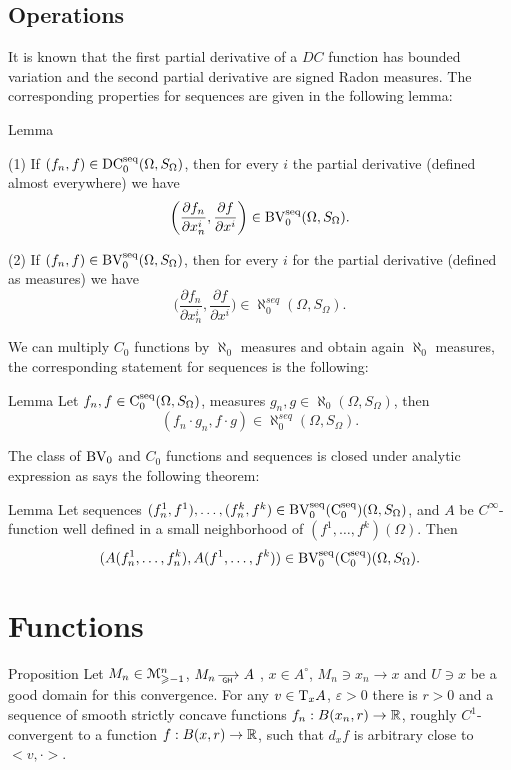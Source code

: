 \subsection{Operations}

It is known that
the first partial derivative of a $DC$ function has bounded variation
and the second partial derivative are signed Radon measures.
The corresponding properties for sequences are given in the following lemma:

\begin{thm}{Lemma}\label{thm-D}

(1) If $( f_n, f)\in\operatorname{DC_0^{seq}}(\Omega,S_\Omega)$,
then for every $i$ the partial derivative (defined almost everywhere)
we have
$$\biggl(\frac{\partial f_n}{\partial x_n^i}, \frac{\partial f}{\partial x^i}\biggr)\in\operatorname{BV_0^{seq}}(\Omega,S_\Omega).$$

(2) 
 If     $( f_n, f)\in\operatorname{BV_0^{seq}}(\Omega,S_\Omega)$, 
then for every $i$ for the partial derivative (defined as measures)
we have
$$\biggl(\frac{\partial f_n}{\partial x_n^i}, \frac{\partial f}{\partial x^i}\biggr)\in\aleph_0^{seq}(\Omega,S_\Omega).$$

\end{thm}

We can  multiply $C_0$ functions by $\aleph_0$ measures and
obtain again $\aleph_0$ measures, the corresponding statement
for sequences is the following:

\begin{thm}{Lemma}\label{thm-CM}
Let $f_n, f\in\operatorname{C_0^{seq}}(\Omega,S_\Omega)$,
measures $g_n, g\in\aleph_0(\Omega,S_\Omega)$,
then
$$(f_n\cdot g_n,f\cdot g)\in\aleph_0^{seq}(\Omega,S_\Omega).$$
\end{thm}

The class of $\operatorname{BV_0}$ and $C_0$ functions and sequences is closed under analytic expression as
says the following theorem:
\begin{thm}{Lemma}\label{thm-A}
Let sequences $(f^1_n,f^1),\dots,(f^k_n, f^k) \in \operatorname{BV_0^{seq}(C_0^{seq})}(\Omega,S_\Omega)$,
and $A$ be  $C^\infty$-function well defined in a small neighborhood of
$(f^1,\dots,f^k)(\Omega)$.
Then $$(A(f^1_n,\dots,f^k_n), A(f^1,\dots,f^k))\in\operatorname{BV_0^{seq}(C_0^{seq})}(\Omega,S_\Omega).$$
\end{thm}


\section{ Functions }
 \begin{thm}{Proposition}\label{NiceFunctions}
 Let   
	$M_n\in\mathcal M_{\geqslant -1}^n$,
	$M_n\GHto A$ , $ x\in A^\circ$, $M_n\ni x_n\to x$
	and $U\ni x$
	be a good domain for this convergence.
 For any
  $v\in \mathrm{T}_xA$,
 $\varepsilon>0$
 there is  $r>0$
 and a
  sequence of smooth strictly concave functions
 $f_n: B(x_n,r)\to \mathbb{R}$, roughly $C^1$-convergent to a function 
 $ f:B(x,r)\to\mathbb{R}$,
such that $d_xf$  is arbitrary close to $ <v,\cdot>$.
 \end{thm}
  
